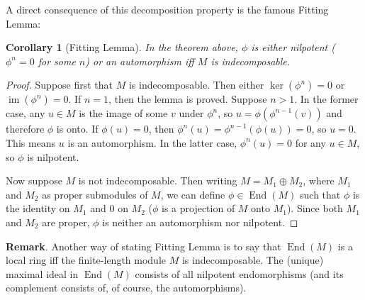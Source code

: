 \documentclass[12pt]{article}
\newtheorem{cor}{Corollary}
\begin{document}
A direct consequence of this decomposition property is the famous Fitting Lemma:

\begin{cor}[Fitting Lemma] In the theorem above, $\phi$ is either nilpotent ($\phi^n=0$ for some $n$) or an automorphism iff $M$ is indecomposable.  \end{cor}
\begin{proof}
Suppose first that $M$ is indecomposable.  Then either $\ker(\phi^n)=0$ or $\operatorname{im}(\phi^n)=0$.  If $n=1$, then the lemma is proved.  Suppose $n>1$.  In the former case, any $u\in M$ is the image of some $v$ under $\phi^n$, so $u=\phi(\phi^{n-1}(v))$ and therefore $\phi$ is onto.  If $\phi(u)=0$, then $\phi^n(u)=\phi^{n-1}(\phi(u))=0$, so $u=0$.  This means $u$ is an automorphism.  In the latter case, $\phi^n(u)=0$ for any $u\in M$, so $\phi$ is nilpotent.

Now suppose $M$ is not indecomposable.  Then writing $M=M_1\oplus M_2$, where $M_1$ and $M_2$ as proper submodules of $M$, we can define $\phi\in \operatorname{End}(M)$ such that $\phi$ is the identity on $M_1$ and $0$ on $M_2$ ($\phi$ is a projection of $M$ onto $M_1$).  Since both $M_1$ and $M_2$ are proper, $\phi$ is neither an automorphism nor nilpotent.
\end{proof}

\textbf{Remark}.  Another way of stating Fitting Lemma is to say that $\operatorname{End}(M)$ is a local ring iff the finite-length module $M$ is indecomposable.  The (unique) maximal ideal in $\operatorname{End}(M)$ consists of all nilpotent endomorphisms (and its complement consists of, of course, the automorphisms).
\end{document}
